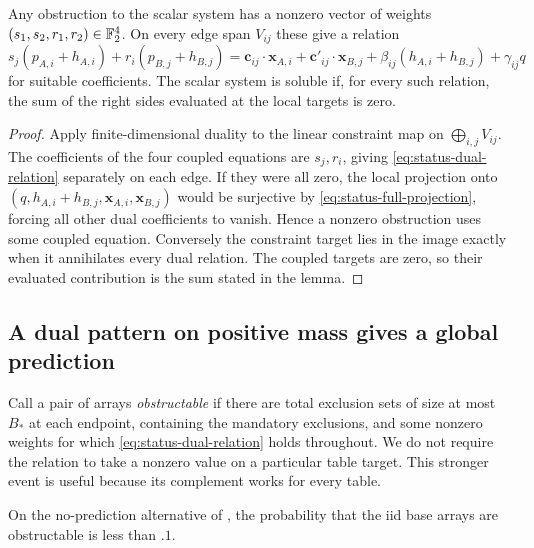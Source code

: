 \begin{lemma}
\label{lem:status-duality}
Any obstruction to the scalar system has a nonzero vector of weights
$(s_1,s_2,r_1,r_2)\in\mathbb F_2^4$. On every edge span $V_{ij}$ these give
a relation
\begin{equation}
\label{eq:status-dual-relation}
s_j(p_{A,i}+h_{A,i})+r_i(p_{B,j}+h_{B,j})
=\mathbf c_{ij}\cdot\mathbf x_{A,i}
 +\mathbf c'_{ij}\cdot\mathbf x_{B,j}
 +\beta_{ij}(h_{A,i}+h_{B,j})+\gamma_{ij}q
\end{equation}
for suitable coefficients. The scalar system is soluble if, for every
such relation, the sum of the right sides evaluated at the local targets
is zero.
\end{lemma}

\begin{proof}
Apply finite-dimensional duality to the linear constraint map on
$\bigoplus_{i,j}V_{ij}$. The coefficients of the four coupled equations
are $s_j,r_i$, giving \eqref{eq:status-dual-relation} separately on each
edge. If they were all zero, the local projection onto
$(q,h_{A,i}+h_{B,j},\mathbf x_{A,i},\mathbf x_{B,j})$ would be
surjective by \eqref{eq:status-full-projection}, forcing all other dual
coefficients to vanish. Hence a nonzero obstruction uses some coupled
equation. Conversely the constraint target lies in the image exactly
when it annihilates every dual relation. The coupled targets are zero,
so their evaluated contribution is the sum stated in the lemma.
\end{proof}

\subsection{A dual pattern on positive mass gives a global prediction}

Call a pair of arrays \emph{obstructable} if there are total exclusion
sets of size at most $B_*$ at each endpoint, containing the mandatory
exclusions, and some nonzero weights for which
\eqref{eq:status-dual-relation} holds throughout. We do not require the
relation to take a nonzero value on a particular table target. This
stronger event is useful because its complement works for every table.

\begin{lemma}
\label{lem:status-global-prediction}
On the no-prediction alternative of , the
probability that the iid base arrays are obstructable is less than $.1$.
\end{lemma}


